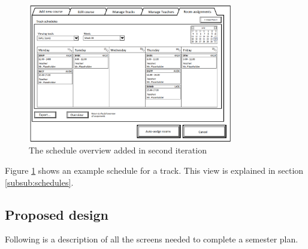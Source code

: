 \begin{figure}[htb]
\begin{center}
\leavevmode
\includegraphics[width=0.8\textwidth]{images/sem2_room_sche}
\end{center}
\caption{The schedule overview added in second iteration}
\label{fig:sem2_room_sche}
\end{figure}

Figure \ref{fig:sem2_room_sche} shows an example schedule for a track. This view is explained in section \ref{subsub:schedules}.

\subsection{Proposed design}
\label{subsec:proposed_design_sem}

Following is a description of all the screens needed to complete a semester plan.

